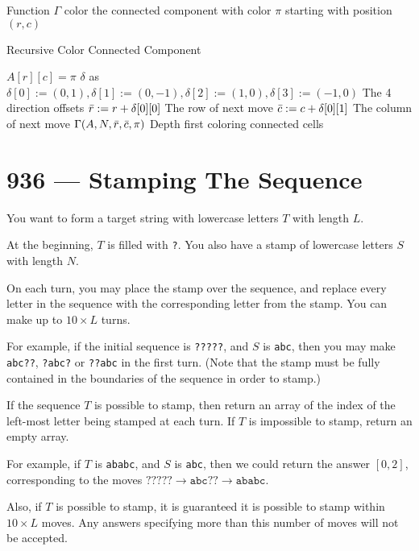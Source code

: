 \documentclass[a4paper,12pt]{article}
\begin{document}
Function $\Gamma$ color the connected component with color $\pi$ starting with position $(r,c)$
\begin{algorithm}[H]
\caption{Recursive Color Connected Component}
\begin{algorithmic}[1]
\State $A[r][c] = \pi$
\State $\delta$ as $\delta[0]:=(0,1), \delta[1]:=(0,-1), \delta[2]:=(1,0), \delta[3]:=(-1,0)$ \Comment The 4 direction offsets
\State $\Bar{r}:=r + \delta[0][0]$ \Comment The row of next move
\State $\Bar{c}:=c + \delta[0][1]$ \Comment The column of next move
\State $\Gamma(A, N, \Bar{r}, \Bar{c}, \pi)$ \Comment Depth first coloring connected cells
\EndIf
\EndFor
\EndFunction
\end{algorithmic}
\end{algorithm}

\section{936 --- Stamping The Sequence}
You want to form a target string with lowercase letters $T$ with length $L$.
\par
At the beginning, $T$ is filled with \texttt{?}.  You also have a stamp of lowercase letters $S$ with length $N$.
\par
On each turn, you may place the stamp over the sequence, and replace every letter in the sequence with the corresponding letter from the stamp.  You can make up to $10 \times L$ turns.
\par
For example, if the initial sequence is \texttt{?????}, and $S$ is \texttt{abc},  then you may make \texttt{abc??}, \texttt{?abc?} or \texttt{??abc} in the first turn.  (Note that the stamp must be fully contained in the boundaries of the sequence in order to stamp.)
\par
If the sequence $T$ is possible to stamp, then return an array of the index of the left-most letter being stamped at each turn. If $T$ is impossible to stamp, return an empty array.
\par
For example, if $T$ is \texttt{ababc}, and $S$ is \texttt{abc}, then we could return the answer $[0, 2]$, corresponding to the moves $\texttt{?????} \longrightarrow \texttt{abc??} \longrightarrow \texttt{ababc}$.
\par
Also, if $T$ is possible to stamp, it is guaranteed it is possible to stamp within $10 \times L$ moves.  Any answers specifying more than this number of moves will not be accepted.
\end{document}
